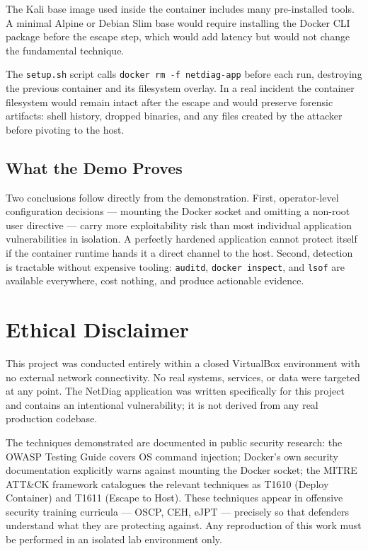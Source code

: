 The Kali base image used inside the container includes many pre-installed tools.
A minimal Alpine or Debian Slim base would require installing the Docker CLI
package before the escape step, which would add latency but would not change the
fundamental technique.

The \texttt{setup.sh} script calls \texttt{docker rm -f netdiag-app} before
each run, destroying the previous container and its filesystem overlay. In a
real incident the container filesystem would remain intact after the escape and
would preserve forensic artifacts: shell history, dropped binaries, and any
files created by the attacker before pivoting to the host.

\subsection{What the Demo Proves}

Two conclusions follow directly from the demonstration. First, operator-level
configuration decisions --- mounting the Docker socket and omitting a non-root
user directive --- carry more exploitability risk than most individual
application vulnerabilities in isolation. A perfectly hardened application
cannot protect itself if the container runtime hands it a direct channel to the
host. Second, detection is tractable without expensive tooling: \texttt{auditd},
\texttt{docker inspect}, and \texttt{lsof} are available everywhere, cost
nothing, and produce actionable evidence.

\section{Ethical Disclaimer}

This project was conducted entirely within a closed VirtualBox environment with
no external network connectivity. No real systems, services, or data were
targeted at any point. The NetDiag application was written specifically for this
project and contains an intentional vulnerability; it is not derived from any
real production codebase.

The techniques demonstrated are documented in public security research: the OWASP
Testing Guide covers OS command injection; Docker's own security documentation
explicitly warns against mounting the Docker socket; the MITRE ATT\&CK framework
catalogues the relevant techniques as T1610 (Deploy Container) and T1611 (Escape
to Host). These techniques appear in offensive security training curricula ---
OSCP, CEH, eJPT --- precisely so that defenders understand what they are
protecting against. Any reproduction of this work must be performed in an
isolated lab environment only.

